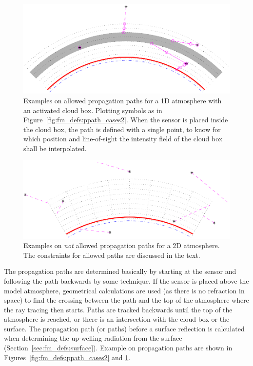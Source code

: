 \begin{figure}[!p]
 \begin{center}
  \includegraphics*[width=0.95\hsize]{ppath_cases1}
  \caption{Examples on allowed propagation paths for a 1D atmosphere
    with an activated cloud box. Plotting symbols as in
    Figure~\ref{fig:fm_defs:ppath_cases2}. When the sensor is placed 
    inside the cloud box, the path is defined with a single point, 
    to know for which position and line-of-sight the intensity field of
    the cloud box shall be interpolated. }
  \label{fig:fm_defs:ppath_cases1}
 \end{center}
\end{figure}

\begin{figure}[!t]
 \begin{center}
  \includegraphics*[width=0.95\hsize]{ppath_badcases}
  \caption{Examples on \emph{not} allowed propagation paths for a 2D 
    atmosphere. The constraints for allowed paths are discussed in the
    text.}
  \label{fig:fm_defs:ppath_badcases}
 \end{center}
\end{figure}


The propagation paths are determined basically by starting at the
sensor and following the path backwards by some  technique. If the sensor is placed above the model
atmosphere, geometrical calculations are used (as there is no
refraction in space) to find the crossing between the path and the top
of the atmosphere where the ray tracing then starts. Paths are tracked
backwards until the top of the atmosphere is reached, or there is an
intersection with the cloud box or the surface. The propagation path
(or paths) before a surface reflection is calculated when determining
the up-welling radiation from the surface
(Section~\ref{sec:fm_defs:surface}). Example on propagation
paths are shown in Figures~\ref{fig:fm_defs:ppath_cases2} and 
\ref{fig:fm_defs:ppath_cases1}.
 
